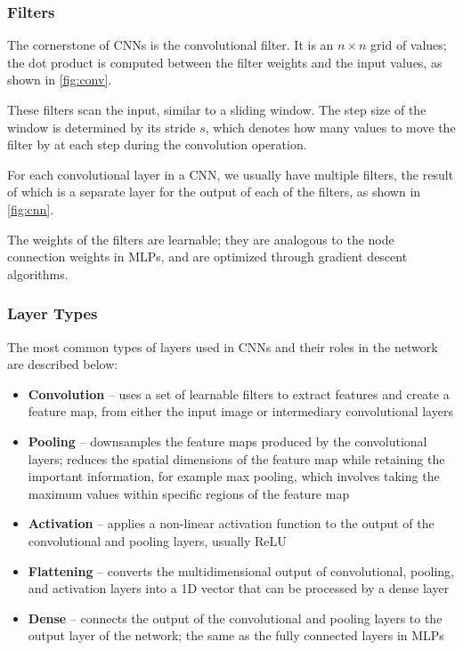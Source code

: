 \subsubsection{Filters}

The cornerstone of CNNs is the convolutional filter. It is an $n\times n$ grid
of values; the dot product is computed between the filter weights and the input
values, as shown in \autoref{fig:conv}.



These filters scan the input, similar to a sliding window. The step size of the
window is determined by its stride $s$, which denotes how many values to move
the filter by at each step during the convolution operation.

For each convolutional layer in a CNN, we usually have multiple filters, the
result of which is a separate layer for the output of each of the filters, as
shown in \autoref{fig:cnn}.

The weights of the filters are learnable; they are analogous to the node
connection weights in MLPs, and are optimized through gradient descent
algorithms.



\subsubsection{Layer Types}

The most common types of layers used in CNNs and their roles in the network are
described below:

\begin{itemize}
  \item \textbf{Convolution} -- uses a set of learnable filters to extract features and create a feature map, from either the input image or intermediary convolutional layers \cite{o2015introduction}
  \item \textbf{Pooling} -- downsamples the feature maps produced by the convolutional layers; reduces the spatial dimensions of the feature map while retaining the important information, for example max pooling, which involves taking the maximum values within specific regions of the feature map \cite{lecun2015deep}
  \item \textbf{Activation} -- applies a non-linear activation function to the output of the convolutional and pooling layers, usually ReLU
  \item \textbf{Flattening} -- converts the multidimensional output of convolutional, pooling, and activation layers into a 1D vector that can be processed by a dense layer
  \item \textbf{Dense} -- connects the output of the convolutional and pooling layers to the output layer of the network; the same as the fully connected layers in MLPs
\end{itemize}

